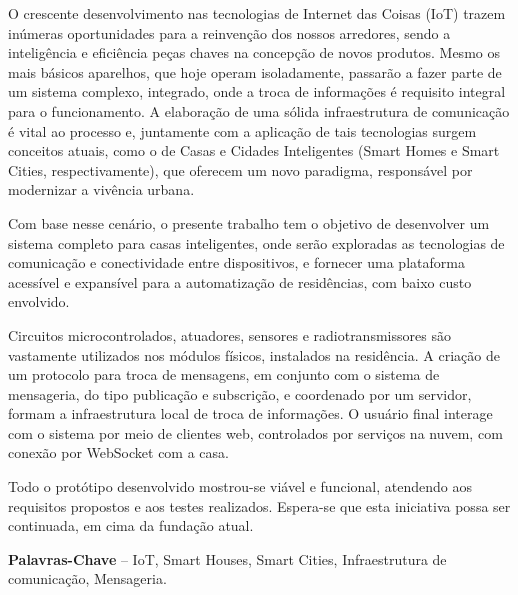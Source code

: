 \begin{resumo}
%
O crescente desenvolvimento nas tecnologias de Internet das Coisas (IoT) trazem inúmeras oportunidades para a reinvenção dos nossos arredores, sendo a inteligência e eficiência peças chaves na concepção de novos produtos. Mesmo os mais básicos aparelhos, que hoje operam isoladamente, passarão a fazer parte de um sistema complexo, integrado, onde a troca de informações é requisito integral para o funcionamento. A elaboração de uma sólida infraestrutura de comunicação é vital ao processo e, juntamente com a aplicação de tais tecnologias surgem conceitos atuais, como o de Casas e Cidades Inteligentes (Smart Homes e Smart Cities, respectivamente), que oferecem um novo paradigma, responsável por modernizar a vivência urbana.

Com base nesse cenário, o presente trabalho tem o objetivo de desenvolver um sistema completo para casas inteligentes, onde serão exploradas as tecnologias de comunicação e conectividade entre dispositivos, e fornecer uma plataforma acessível e expansível para a automatização de residências, com baixo custo envolvido.

Circuitos microcontrolados, atuadores, sensores e radiotransmissores são vastamente utilizados nos módulos físicos, instalados na residência. A criação de um protocolo para troca de mensagens, em conjunto com o sistema de mensageria, do tipo publicação e subscrição, e coordenado por um servidor, formam a infraestrutura local de troca de informações. O usuário final interage com o sistema por meio de clientes web, controlados por serviços na nuvem, com conexão por WebSocket com a casa.

Todo o protótipo desenvolvido mostrou-se viável e funcional, atendendo aos requisitos propostos e aos testes realizados. Espera-se que esta iniciativa possa ser continuada, em cima da fundação atual.

%
\textbf{Palavras-Chave} -- IoT, Smart Houses, Smart Cities, Infraestrutura de comunicação, Mensageria.
\end{resumo}
